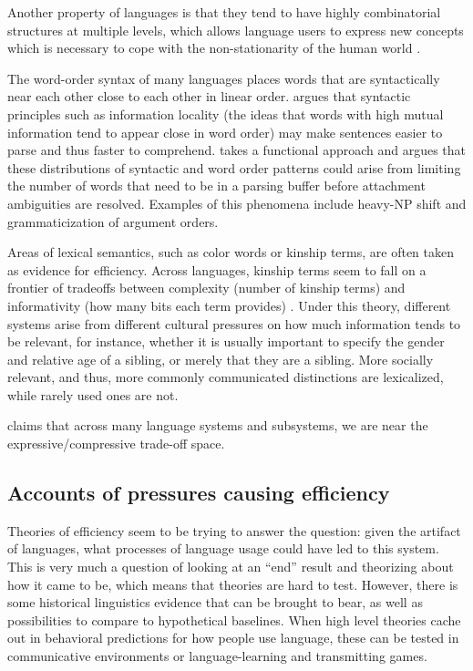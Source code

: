 \documentclass[]{article}
\begin{document}
Another property of languages is that they tend to have highly combinatorial structures at multiple levels, which allows language users to express new concepts which is necessary to cope with the non-stationarity of the human world \cite{kirby2015}. %

The word-order syntax of many languages places words that are syntactically near each other close to each other in linear order. \cite{gibson2019} argues that syntactic principles such as information locality (the ideas that words with high mutual information tend to appear close in word order) may make sentences easier to parse and thus faster to comprehend. %
\cite{hawkins1995} takes a functional approach and argues that these distributions of syntactic and word order patterns could arise from limiting the number of words that need to be in a parsing buffer before attachment ambiguities are resolved. Examples of this phenomena include heavy-NP shift and grammaticization of argument orders. 

Areas of lexical semantics, such as color words or kinship terms, are often taken as evidence for efficiency. Across languages, kinship terms seem to fall on a frontier of tradeoffs between complexity (number of kinship terms) and informativity (how many bits each term provides) \cite{kemp2018}. Under this theory, different systems arise from different cultural pressures on how much information tends to be relevant, for instance, whether it is usually important to specify the gender and relative age of a sibling, or merely that they are a sibling. More socially relevant, and thus, more commonly communicated distinctions are lexicalized, while rarely used ones are not. 

\cite{kirby2015} claims that across many language systems and subsystems, we are near the expressive/compressive trade-off space. %

\subsection{Accounts of pressures causing efficiency}
Theories of efficiency seem to be trying to answer the question: given the artifact of languages, what processes of language usage could have led to this system. This is very much a question of looking at an ``end'' result and theorizing about how it came to be, which means that theories are hard to test. However, there is some historical linguistics evidence that can be brought to bear, as well as possibilities to compare to hypothetical baselines. When high level theories cache out in behavioral predictions for how people use language, these can be tested in communicative environments or language-learning and transmitting games. 
\end{document}
